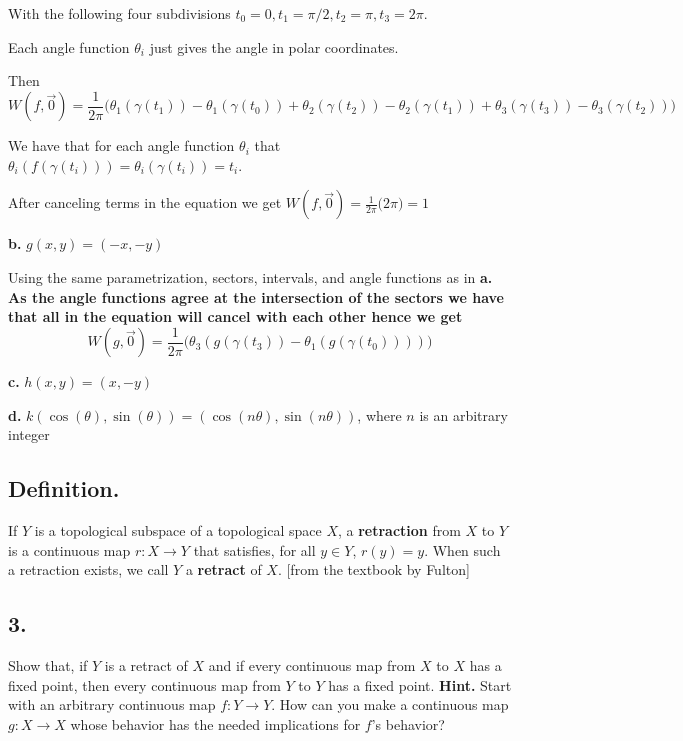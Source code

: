 \documentclass{amsart}
\theoremstyle{plain}
\theoremstyle{definition}
\theoremstyle{remark}
\begin{document}
With the following four subdivisions $t_0= 0,t_1=\pi/2,t_2=\pi,t_3=2\pi$. 

Each angle function $\theta_i$ just gives the angle in polar coordinates.

Then 
\[
    W(f,\vec 0)=\frac{1}{2\pi}\big(\theta_1(\gamma (t_1))- \theta_1 (\gamma(t_0))+\theta_2(\gamma(t_2))-\theta_2(\gamma(t_1))+\theta_3(\gamma(t_3))-\theta_3(\gamma(t_2))\big)
\]

We have that for each angle function $\theta_i$ that $\theta_i(f(\gamma(t_i)))=\theta_i(\gamma(t_i))=t_i$.

After canceling terms in the equation we get $W(f,\vec 0)=\frac{1}{2\pi}\big(2\pi \big)=1$


\vspace{.1in}
{\bfseries b.} $g(x,y) = (-x,-y)$

{ 
    Using the same parametrization, sectors, intervals, and angle functions as in \bfseries a. As the angle functions agree at the intersection of the sectors we have that all in the equation will cancel with each other hence we get 
    \[
    W(g,\vec 0)=\frac{1}{2\pi}\big(\theta_3(g(\gamma (t_3))-\theta_1(g(\gamma(t_0))))\big)
    \]


}

\vspace{.1in}
{\bfseries c.} $h(x,y) = (x,-y)$

\vspace{.1in}
{\bfseries d.} $k(\cos (\theta ), \sin (\theta )) = (\cos (n\theta ), \sin (n\theta ))$, where $n$ is an arbitrary integer


\vspace{.15in}
\subsection*{Definition.}  If $Y$ is a topological subspace of a topological space $X$, a {\bf retraction} from $X$ to $Y$ is a continuous map $r : X \to Y$ that satisfies, for all $y\in Y$, $r(y) = y$. When such a retraction exists, we call $Y$ a {\bf retract} of $X$. [from the textbook by Fulton]

\vspace{.15in}
\noindent
\subsection*{3.} Show that, if $Y$ is a retract of $X$ and if every continuous map from $X$ to $X$ has a fixed point, then every continuous map from $Y$ to $Y$ has a fixed point. {\bf Hint.} Start with an arbitrary continuous map $f : Y\to Y$. How can you make a continuous map $g : X\to X$ whose behavior has the needed implications for $f$'s behavior?
 
\end{document}
